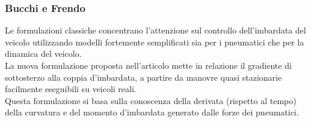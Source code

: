 \subsubsection{Bucchi e Frendo}

Le formulazioni classiche concentrano l'attenzione sul controllo dell'imbardata del veicolo utilizzando modelli fortemente semplificati sia per i pneumatici che per la dinamica del veicolo.\\
La nuova formulazione proposta nell'articolo \cite{doi:10.1080/00423114.2016.1167225} mette in relazione  il gradiente di sottosterzo alla coppia d'imbardata, a partire da manovre quasi stazionarie facilmente eseguibili su veicoli reali.\\
Questa formulazione si basa sulla conoscenza della derivata (rispetto al tempo) della curvatura e del momento d'imbardata generato dalle forze dei pneumatici.\\

